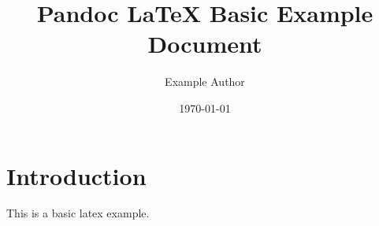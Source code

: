 \documentclass{article}
\title{Pandoc LaTeX Basic Example Document}
\author{Example Author}
\date{\today}
\begin{document}
\maketitle

\tableofcontents
\newpage

\section{Introduction}

This is a basic latex example.
\end{document}
